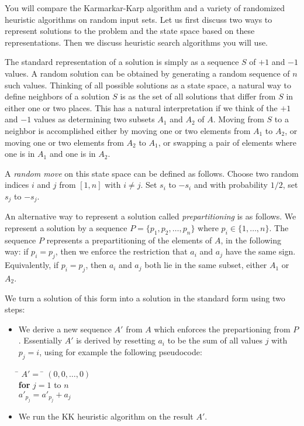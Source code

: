 \documentclass[11pt]{article}
\begin{document}
\smallskip

You will compare the Karmarkar-Karp algorithm and a variety of
randomized heuristic algorithms on random input sets.  Let us first
discuss two ways to represent solutions to the problem and the state
space based on these representations.  Then we discuss heuristic
search algorithms you will use.

The standard representation of a solution is simply as a sequence $S$
of $+1$ and $-1$ values.  A random solution can be obtained by
generating a random sequence of $n$ such values.  Thinking of all
possible solutions as a state space, a natural way to define neighbors
of a solution $S$ is as the set of all solutions that differ from $S$
in either one or two places.  This has a natural interpretation if we
think of the $+1$ and $-1$ values as determining two subsets $A_1$
and $A_2$ of $A$.  Moving from $S$ to a neighbor is accomplished
either by moving one or two elements from $A_1$ to $A_2$, or moving
one or two elements from $A_2$ to $A_1$, or swapping a pair of
elements where one is in $A_1$ and one is in $A_2$.

A {\em random move} on this state space can be defined as follows.
Choose two random indices $i$ and $j$ from $[1,n]$ with $i
\neq j$.  Set $s_i$ to $-s_i$ and with probability $1/2$, set $s_j$ to
$-s_j$.  

An alternative way to represent a solution called {\em
prepartitioning} is as follows.  We represent a solution by a sequence
$P = \{p_1,p_2,\ldots,p_n\}$ where $p_i \in \{1,\ldots,n\}$.  The
sequence $P$ represents a prepartitioning of the elements of $A$, in
the following way: if $p_i = p_j$, then we enforce the restriction
that $a_i$ and $a_j$ have the same sign.  Equivalently, if $p_i =
p_j$, then $a_i$ and $a_j$ both lie in the same subset, either $A_1$
or $A_2$.

We turn a solution of this form into a solution in the standard
form using two steps:  
\begin{itemize}
\item We derive a new sequence $A'$ from $A$ which enforces the
prepartioning from $P$.  Essentially $A'$ is derived by resetting
$a_i$ to be the sum of all values $j$ with $p_j = i$, using for
example the following pseudocode:

\smallskip
\begin{tabbing}
\quad \quad \quad \= $A' =$ \= $(0,0,\ldots,0)$ \\
\> {\bf for} $j = 1$ to $n$ \\
\> \> $a'_{p_j} = a'_{p_j} + a_j$  \\
\end{tabbing}
\smallskip

\item We run the KK heuristic algorithm on the result $A'$.
\end{itemize}
\end{document}
